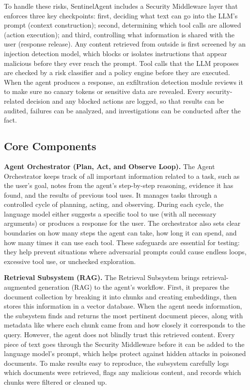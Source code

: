 \documentclass[11pt]{article}
\begin{document}
To handle these risks, SentinelAgent includes a Security Middleware layer that enforces three key checkpoints: first, deciding what text can go into the LLM's prompt (context construction); second, determining which tool calls are allowed (action execution); and third, controlling what information is shared with the user (response release). Any content retrieved from outside is first screened by an injection detection model, which blocks or isolates instructions that appear malicious before they ever reach the prompt. Tool calls that the LLM proposes are checked by a risk classifier and a policy engine before they are executed. When the agent produces a response, an exfiltration detection module reviews it to make sure no canary tokens or sensitive data are revealed. Every security-related decision and any blocked actions are logged, so that results can be audited, failures can be analyzed, and investigations can be conducted after the fact.

\subsection{Core Components}

\textbf{Agent Orchestrator (Plan, Act, and Observe Loop).}
The Agent Orchestrator keeps track of all important information related to a task, such as the user's goal, notes from the agent's step-by-step reasoning, evidence it has found, and the results of previous tool uses. It manages tasks through a controlled cycle of planning, acting, and observing. During each cycle, the language model either suggests a specific tool to use (with all necessary arguments) or produces a response for the user. The orchestrator also sets clear boundaries on how many steps the agent can take, how long it can spend, and how many times it can use each tool. These safeguards are essential for testing: they help prevent situations where adversarial prompts could cause endless loops, excessive tool use, or unchecked exploration.

\textbf{Retrieval Subsystem (RAG).}
The Retrieval Subsystem brings retrieval-augmented generation (RAG) to the agent's workflow. First, it prepares the document collection by breaking it into chunks and creating embeddings, then stores this information in a vector database. When the agent needs information, the subsystem finds and returns the most pertinent document pieces, along with metadata like where each chunk came from and how closely it corresponds to the query. However, the agent does not blindly trust this retrieved content. Every piece of text goes through the Security Middleware before it can be added to the language model's prompt, which helps protect against hidden attacks in poisoned documents. To make results easy to reproduce, the subsystem carefully logs which documents were retrieved, flags any malicious content, and records which chunks were filtered or cleaned up.
\end{document}
